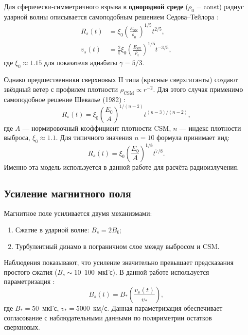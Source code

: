 \documentclass[a4paper,12pt]{extarticle}
\newcommand{\rs}{R_s}
\newcommand{\vs}{v_s}
\newcommand{\csm}{\text{CSM}}
\newcommand{\esn}{E_{\text{SN}}}
\begin{document}
Для сферически-симметричного взрыва в \textbf{однородной среде} ($\rho_0 = \text{const}$) радиус ударной волны описывается самоподобным решением Седова–Тейлора \cite{sedov1959, taylor1950}:
\begin{align}
    \rs(t) &= \xi_0 \left( \frac{\esn}{\rho_0} \right)^{1/5} t^{2/5}, \label{eq:sedov} \\
    \vs(t) &= \frac{2}{5} \xi_0 \left( \frac{\esn}{\rho_0} \right)^{1/5} t^{-3/5},
\end{align}
где $\xi_0 \approx 1.15$ для показателя адиабаты $\gamma = 5/3$.

Однако предшественники сверхновых II типа (красные сверхгиганты) создают звёздный ветер с профилем плотности $\rho_{\csm} \propto r^{-2}$. Для этого случая применимо самоподобное решение Шевалье (1982) \cite{chevalier1982}:
\begin{equation}
    \rs(t) = \xi_0 \left( \frac{E_0}{A} \right)^{1/(n-2)} t^{(n-3)/(n-2)}, \label{eq:chevalier}
\end{equation}
где $A$ — нормировочный коэффициент плотности CSM, $n$ — индекс плотности выброса, $\xi_0 \approx 1.1$. Для типичного значения $n = 10$ формула принимает вид:
\begin{equation}
    \rs(t) = \xi_0 \left( \frac{E_0}{A} \right)^{1/8} t^{7/8}.
\end{equation}
Именно эта модель используется в данной работе для расчёта радиоизлучения.

\subsection{Усиление магнитного поля}

Магнитное поле усиливается двумя механизмами:
\begin{enumerate}
    \item Сжатие в ударной волне: $B_s = 2 B_0$;
    \item Турбулентный динамо в пограничном слое между выбросом и CSM.
\end{enumerate}

Наблюдения показывают, что усиление значительно превышает предсказания простого сжатия ($B_s \sim 10$–$100$~мкГс). В данной работе используется параметризация \cite{reynolds2008}:
\begin{equation}
    B_s(t) = B_* \left( \frac{\vs(t)}{v_*} \right), \label{eq:B}
\end{equation}
где $B_* = 50$~мкГс, $v_* = 5000$~км/с. Данная параметризация обеспечивает согласование с наблюдательными данными по поляриметрии остатков сверхновых.
\end{document}
